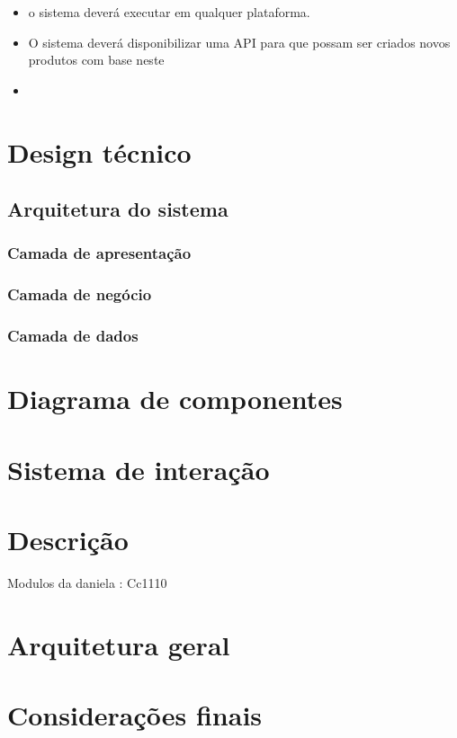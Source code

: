 \begin{itemize}
	\item  o sistema deverá executar em qualquer plataforma.
	
	\item O sistema deverá disponibilizar uma API para que possam ser criados novos produtos com base neste 
	
	\item 
	
\end{itemize}







\section{Design técnico}



\subsection{Arquitetura do sistema}



\subsubsection{Camada de apresentação}


\subsubsection{Camada de negócio}



\subsubsection{Camada de dados}




\section{Diagrama de componentes}




\section{Sistema de interação}


\section{Descrição}


Modulos da daniela : Cc1110



\section{Arquitetura geral}




\newpage












\section{Considerações finais}